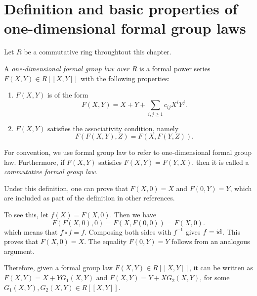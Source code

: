 \section{Definition and basic properties of one-dimensional
formal group laws}

Let $R$ be a commutative ring throughtout this chapter.

\begin{definition}
    A \emph{one-dimensional formal group law over $R$} is a formal power
    series $F(X, Y) \in R[\![X,Y]\!]$ with the following properties:
    \begin{enumerate}
        \item $F(X,Y)$ is of the form
        \begin{equation*}
            F(X,Y) = X + Y + \sum_{i, j\ge 1}c_{ij} X^i Y^j.
        \end{equation*}
        \item $F(X,Y)$ satisfies the associativity condition, namely
        \begin{equation*}
            F(F(X,Y),Z) = F(X,F(Y,Z)).
        \end{equation*}
    \end{enumerate}
    For convention, we use formal group law to refer to one-dimensional formal group law.
    Furthermore, if $F(X,Y)$ satisfies $F(X,Y) = F(Y,X)$, then it is called
    a \emph{commutative formal group law}.
    \label{Defn formal group}
\end{definition}

\begin{remark}
    Under this definition, one can prove that $F(X,0) = X$ and $F(0,Y) = Y$, which are included
    as part of the definition in other references.

    To see this, let  $f(X) = F(X,0)$. Then we have
        \[F(F(X,0),0)= F(X,F(0,0))= F(X,0).\]
    which
    means that $f \circ f = f$. Composing both sides with $f^{-1}$ gives $f = \mathrm{id}$.
    This proves that $F(X,0) = X$. The equality $F(0,Y)= Y$ follows from an analogous argument.

    Therefore, given a formal group law $F(X,Y) \in R[\![X,Y]\!]$, it can be written as
    $F(X,Y)= X + YG_1(X,Y)$ and $F(X,Y) = Y + XG_2(X,Y)$,
    for some $G_1(X,Y), G_2(X,Y) \in R [\![X,Y]\!]$.
\end{remark}


